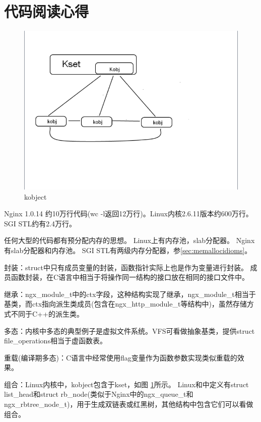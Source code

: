 \section{代码阅读心得}

\begin{figure}
  \begin{center}
    \includegraphics[keepaspectratio,width=0.36\paperwidth]{Pictures/kobject.png}
    \caption{kobject}
    \label{fig:kobject}
  \end{center}
\end{figure}

Nginx 1.0.14 约10万行代码(wc -l返回12万行)。Linux内核2.6.11版本约600万行。SGI STL约有2.4万行。


任何大型的代码都有预分配内存的思想。
Linux上有内存池，slab分配器。
Nginx有slab分配器和内存池。
SGI STL有两级内存分配器，参\ref{sec:memallocidioms}。

封装：struct中只有成员变量的封装，函数指针实际上也是作为变量进行封装。
成员函数封装，在C语言中相当于将操作同一结构的接口放在相同的接口文件中。

继承：ngx\_module\_t中的ctx字段，这种结构实现了继承，ngx\_module\_t相当于基类，而ctx指向派生类成员(包含在ngx\_http\_module\_t等结构中)，虽然存储方式不同于C++的派生类。

多态：内核中多态的典型例子是虚拟文件系统。VFS可看做抽象基类，提供struct file\_operations相当于虚函数表。

重载(编译期多态)：C语言中经常使用flag变量作为函数参数实现类似重载的效果。

组合：Linux内核中，kobject包含于kset，如图 \ref{fig:kobject}所示。
Linux和中定义有struct list\_head和struct rb\_node(类似于Nginx中的ngx\_queue\_t和ngx\_rbtree\_node\_t)，用于生成双链表或红黑树，其他结构中包含它们可以看做组合。


